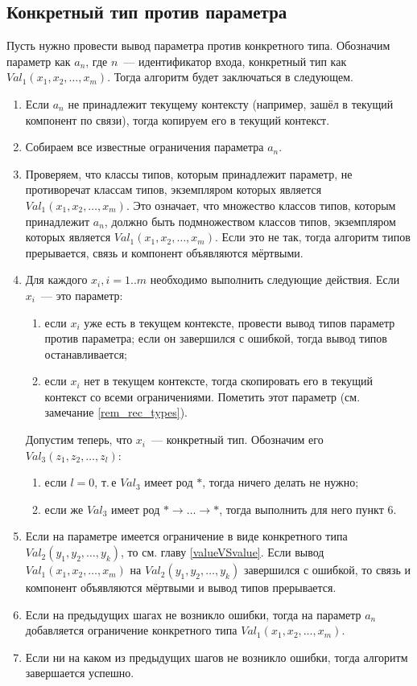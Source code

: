 \subsection{Конкретный тип против параметра}
Пусть нужно провести вывод параметра против конкретного типа. Обозначим параметр как $a_n$, где $n$~--- идентификатор входа, конкретный тип как $Val_1(x_1, x_2, \ldots, x_m)$. Тогда алгоритм будет заключаться в следующем.
\begin{enumerate}
	\item Если $a_n$ не принадлежит текущему контексту (например, зашёл в текущий компонент по связи), тогда копируем его в текущий контекст.
	\item Собираем все известные ограничения параметра $a_n$.
	\item Проверяем, что классы типов, которым принадлежит параметр, не противоречат классам типов, экземпляром которых является $Val_1(x_1, x_2, \ldots, x_m)$. Это означает, что множество классов типов, которым принадлежит $a_n$, должно быть подмножеством классов типов, экземпляром которых является $Val_1(x_1, x_2, \ldots, x_m)$. Если это не так, тогда алгоритм типов прерывается, связь и компонент объявляются мёртвыми.
	\item Для каждого $x_i, i = 1 .. m$ необходимо выполнить следующие действия. Если $x_i$~--- это параметр:
		\begin{enumerate}[1)]
			\item если $x_i$ уже есть в текущем контексте, провести вывод типов параметр против параметра; если он завершился с ошибкой, тогда вывод типов останавливается;
			\item если $x_i$ нет в текущем контексте, тогда скопировать его в текущий контекст со всеми ограничениями. Пометить этот параметр (см. замечание \ref{rem_rec_types}).
		\end{enumerate}	
	Допустим теперь, что $x_i$~--- конкретный тип. Обозначим его $Val_3(z_1, z_2, \ldots, z_l)$:
		\begin{enumerate}[1)]
			\item если $l = 0$, т.\,е $Val_3$ имеет род $*$, тогда ничего делать не нужно;
			\item если же $Val_3$ имеет род $* \rightarrow \ldots \rightarrow *$, тогда выполнить для него пункт 6.
		\end{enumerate}
	\item Если на параметре имеется ограничение в виде конкретного типа $Val_2(y_1, y_2, \ldots, y_k)$, то см. главу \ref{valueVSvalue}. Если вывод $Val_1(x_1, x_2, \ldots, x_m)$ на $Val_2(y_1, y_2, \ldots, y_k)$ завершился с ошибкой, то связь и компонент объявляются мёртвыми и вывод типов прерывается.
	\item Если на предыдущих шагах не возникло ошибки, тогда на параметр $a_n$ добавляется ограничение конкретного типа $Val_1(x_1, x_2, \ldots, x_m)$.
	\item Если ни на каком из предыдущих шагов не возникло ошибки, тогда алгоритм завершается успешно.
\end{enumerate}

